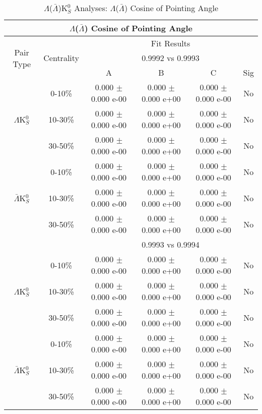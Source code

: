 \documentclass[../AnalysisNoteJBuxton.tex]{subfiles}
\begin{document}
\begin{table}
 \centering
 \begin{tabular}{|c|c|c|c|c|c|}
  \multicolumn{6}{c}{$\Lambda$($\bar{\Lambda}$) Cosine of Pointing Angle} \\
  \hline
  \multirow{3}{*}{Pair Type} & \multirow{3}{*}{Centrality} & \multicolumn{4}{c|}{Fit Results} \\
  \cline{3-6}
   & & \multicolumn{4}{c|}{0.9992 vs 0.9993} \\
  \cline{3-6}
   & & A & B & C & Sig \\
  \hline  
  \multirow{3}{*}{$\Lambda$K$^{0}_{S}$}
   &  0-10\% & 0.000 $\pm$ 0.000 e-00 & 0.000 $\pm$ 0.000 e+00 & 0.000 $\pm$ 0.000 e-00 & No \\
   & 10-30\% & 0.000 $\pm$ 0.000 e-00 & 0.000 $\pm$ 0.000 e+00 & 0.000 $\pm$ 0.000 e-00 & No \\
   & 30-50\% & 0.000 $\pm$ 0.000 e-00 & 0.000 $\pm$ 0.000 e+00 & 0.000 $\pm$ 0.000 e-00 & No \\
  \hline
  \multirow{3}{*}{$\bar{\Lambda}$K$^{0}_{S}$}  
   &  0-10\% & 0.000 $\pm$ 0.000 e-00 & 0.000 $\pm$ 0.000 e+00 & 0.000 $\pm$ 0.000 e-00 & No \\
   & 10-30\% & 0.000 $\pm$ 0.000 e-00 & 0.000 $\pm$ 0.000 e+00 & 0.000 $\pm$ 0.000 e-00 & No \\
   & 30-50\% & 0.000 $\pm$ 0.000 e-00 & 0.000 $\pm$ 0.000 e+00 & 0.000 $\pm$ 0.000 e-00 & No \\
  \hline 
  \multicolumn{2}{|c|}{} & \multicolumn{4}{c|}{0.9993 vs 0.9994} \\
  \hline  
  \multirow{3}{*}{$\Lambda$K$^{0}_{S}$}   
   &  0-10\% & 0.000 $\pm$ 0.000 e-00 & 0.000 $\pm$ 0.000 e+00 & 0.000 $\pm$ 0.000 e-00 & No \\
   & 10-30\% & 0.000 $\pm$ 0.000 e-00 & 0.000 $\pm$ 0.000 e+00 & 0.000 $\pm$ 0.000 e-00 & No \\
   & 30-50\% & 0.000 $\pm$ 0.000 e-00 & 0.000 $\pm$ 0.000 e+00 & 0.000 $\pm$ 0.000 e-00 & No \\
  \hline  
  \multirow{3}{*}{$\bar{\Lambda}$K$^{0}_{S}$}
   &  0-10\% & 0.000 $\pm$ 0.000 e-00 & 0.000 $\pm$ 0.000 e+00 & 0.000 $\pm$ 0.000 e-00 & No \\
   & 10-30\% & 0.000 $\pm$ 0.000 e-00 & 0.000 $\pm$ 0.000 e+00 & 0.000 $\pm$ 0.000 e-00 & No \\
   & 30-50\% & 0.000 $\pm$ 0.000 e-00 & 0.000 $\pm$ 0.000 e+00 & 0.000 $\pm$ 0.000 e-00 & No \\
  \hline
 \end{tabular}
 \caption{$\Lambda$($\bar{\Lambda}$)K$^{0}_{S}$ Analyses: $\Lambda$($\bar{\Lambda}$) Cosine of Pointing Angle}
 \label{tab:LamCosPointingAngleLamK0Full}
\end{table}
\end{document}
